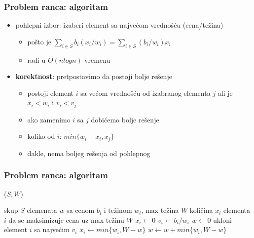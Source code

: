 \documentclass[compress]{beamer}
\begin{document}
\begin{frame}[fragile]
  \frametitle{Problem ranca: algoritam}
  \begin{itemize}
    \item pohlepni izbor: izaberi element sa najvećom vrednošću (cena/težina)
    \begin{itemize}
      \item pošto je $\sum_{i\in S}b_{i}(x_{i}/w_{i}) = \sum_{i\in S}(b_{i}/w_{i})x_{i}$
      \item radi u $O(n log n)$ vremenu
    \end{itemize}
    \item \textbf{korektnost}: pretpostavimo da postoji bolje rešenje
    \begin{itemize}
      \item postoji element $i$ sa većom vrednošću od izabranog elementa 
      $j$ ali je $x_{i}<w_{i}$ i $v_{i}<v_{j}$
      \item ako zamenimo $i$ sa $j$ dobićemo bolje rešenje
      \item koliko od $i$: $min\{w_{i}-x_{i},x_{j}\}$
      \item dakle, nema boljeg rešenja od pohlepnog
    \end{itemize}
  \end{itemize}
\end{frame}

\begin{frame}
  \frametitle{Problem ranca: algoritam}
  ($S, W$)
  \begin{algorithmic}
    \REQUIRE skup $S$ elemenata $w$ sa cenom $b_{i}$ i težinom $w_{i}$, max težina $W$
    \ENSURE količina $x_{i}$ elementa $i$ da se maksimizuje cena uz max težinu $W$
      \STATE $x_{i} \leftarrow 0$
      \STATE $v_{i} \leftarrow b_{i} / w_{i}$ 
    \ENDFOR
    \STATE $w \leftarrow 0$ 
      \STATE ukloni element $i$ sa najvećim $v_{i}$
      \STATE $x_{i} \leftarrow min\{w_{i}, W-w\}$
      \STATE $w \leftarrow w + min\{w_{i}, W-w\}$ 
    \ENDWHILE
  \end{algorithmic}    
\end{frame}
\end{document}
